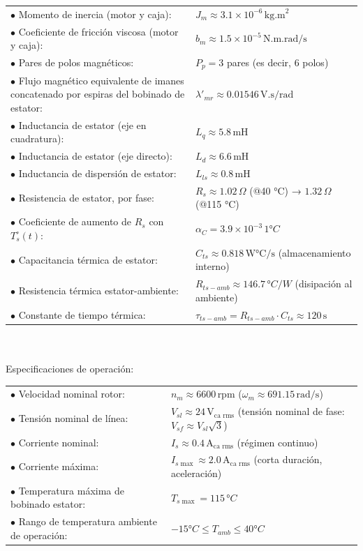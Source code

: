 \documentclass{article}
\begin{document}
    \begin{tabular}{@{} p{} p{} @{}}
        \(\bullet\) Momento de inercia (motor y caja): & \(J_m \approx 3.1 \times 10^{-6} \, \text{kg.m}^2\) \\
        \(\bullet\) Coeficiente de fricción viscosa (motor y caja): & \(b_m \approx 1.5 \times 10^{-5} \, \text{N.m.rad/s}\) \\
        \(\bullet\) Pares de polos magnéticos: & \(P_p = 3\) pares (es decir, 6 polos) \\
        \(\bullet\) Flujo magnético equivalente de imanes concatenado por espiras del bobinado de estator: & \(\lambda'_{mr} \approx 0.01546 \, \text{V.s/rad}\)\\
        \(\bullet\) Inductancia de estator (eje en cuadratura): & \(L_q \approx 5.8 \, \text{mH}\) \\
        \(\bullet\) Inductancia de estator (eje directo): & \(L_d \approx 6.6 \, \text{mH}\) \\
        \(\bullet\) Inductancia de dispersión de estator: & \(L_{ls} \approx 0.8 \, \text{mH}\) \\
        \(\bullet\) Resistencia de estator, por fase: & \(R_s \approx 1.02 \, \Omega\) (@40 °C) → \(1.32 \, \Omega\) (@115 °C) \\
        \(\bullet\) Coeficiente de aumento de \(R_s\) con \(T_s^\circ(t)\): & \(\alpha_C = 3.9 \times 10^{-3} \, 1°C\) \\
        \(\bullet\) Capacitancia térmica de estator: & \(C_{ts} \approx 0.818 \, \text{W°C/s}\) (almacenamiento interno) \\
        \(\bullet\) Resistencia térmica estator-ambiente: & \(R_{ts-amb} \approx 146.7 \, °C/W\) (disipación al ambiente) \\
        \(\bullet\) Constante de tiempo térmica: & \(\tau_{ts-amb} = R_{ts-amb} \cdot C_{ts} \approx 120 \, \text{s}\)
    \end{tabular}    
    \\\\
    Especificaciones de operación:\\

    \begin{tabular}{@{} p{} p{} @{}}
        \(\bullet\) Velocidad nominal rotor: & \(n_m \approx 6600 \, \text{rpm}\) (\(\omega_m \approx 691.15 \, \text{rad/s}\)) \\
        \(\bullet\) Tensión nominal de línea: & \(V_{sl} \approx 24 \, \text{V}_{\text{ca rms}}\) (tensión nominal de fase: \(V_{sf} \approx V_{sl} \sqrt{3}\)) \\
        \(\bullet\) Corriente nominal: & \(I_s \approx 0.4 \, \text{A}_{\text{ca rms}}\) (régimen continuo) \\
        \(\bullet\) Corriente máxima: & \(I_{s \max} \approx 2.0 \, \text{A}_{\text{ca rms}}\) (corta duración, aceleración) \\
        \(\bullet\) Temperatura máxima de bobinado estator: & \(T_{s \max} = 115 \, °C\) \\
        \(\bullet\) Rango de temperatura ambiente de operación: & \(-15 °C \leq T_{amb} \leq 40 °C\)
    \end{tabular}
\end{document}
